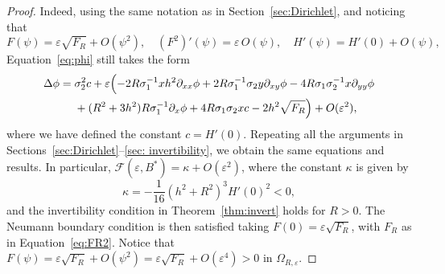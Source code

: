\documentclass[12pt,reqno]{amsart}
\numberwithin{equation}{section}
\theoremstyle{definition}
\theoremstyle{remark}
\begin{document}
\begin{proof}
	Indeed, using the same notation as in Section~\ref{sec:Dirichlet}, and noticing that
	\[
 F (\psi)=\varepsilon \sqrt{F_R}+O(\psi^2),\quad 	(F^2)'(\psi) = \varepsilon\,O(\psi),\quad H'(\psi)=H'(0)+O(\psi),
	\]
	Equation~\eqref{eq:phi} still takes the form
\begin{equation*} 
\begin{split}
\Delta\phi={}&\sigma_2^2c+\varepsilon\Bigl(-2R\sigma_1^{-1}xh^2\partial_{xx}\phi+2  R\sigma_1^{-1}\sigma_2y\partial_{xy}\phi-4R\sigma_1\sigma_2^{-1}x\partial_{yy}\phi\\
&
+(R^2+3h^2)R\sigma_1^{-1}\partial_x\phi 
+4R \sigma_1\sigma_2xc-2h^2 \sqrt{F_R}\Bigr)
+O(\varepsilon^2),
\end{split}
\end{equation*}
where we have defined the constant $c = H'(0)$. Repeating all the arguments in Sections~\ref{sec:Dirichlet}--\ref{sec: invertibility}, we obtain the same equations and results.
	In particular, $\mathcal{F}(\varepsilon,B^*) = \kappa + O(\varepsilon^2)$, where the constant $\kappa$  is given by
	\[
	\kappa =-\frac1{16} \left (h^2+R^2\right )^3H'(0)^2 < 0 ,
	\]
and the invertibility condition in Theorem~\ref{thm:invert} holds for $R>0$.
	The Neumann boundary condition is then satisfied taking $F(0) = \varepsilon \sqrt{F_R}$, with $F_R$ as in Equation~\eqref{eq:FR2}.
	Notice that $F(\psi) = \varepsilon \sqrt{F_R} + O(\psi^2) = \varepsilon \sqrt{F_R} + O(\varepsilon^4) > 0$ in $\varOmega_{R,\varepsilon}$.
\end{proof}
\end{document}
